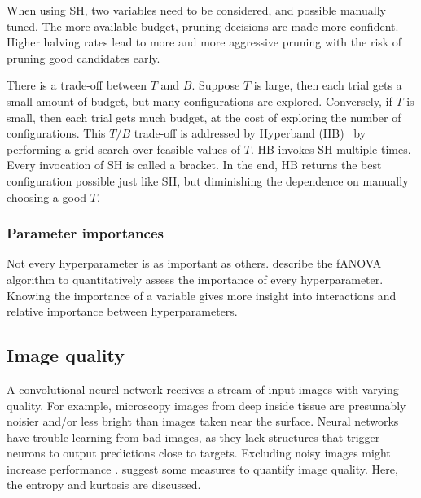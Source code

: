 When using SH, two variables need to be considered, and possible manually tuned.
The more available budget, pruning decisions are made more confident.
Higher halving rates lead to more and more aggressive pruning with the risk of pruning good candidates early.

There is a trade-off between $T$ and $B$.
Suppose $T$ is large, then each trial gets a small amount of budget, but many configurations are explored.
Conversely, if $T$ is small, then each trial gets much budget, at the cost of exploring the number of configurations.
This $T/B$ trade-off is addressed by Hyperband (HB)~ by performing a grid search over feasible values of $T$.
HB invokes SH multiple times.
Every invocation of SH is called a bracket.
In the end, HB returns the best configuration possible just like SH, but diminishing the dependence on manually choosing a good $T$.

\subsubsection{Parameter importances}
Not every hyperparameter is as important as others.
\textcite{Hutter2014} describe the fANOVA algorithm to quantitatively assess the importance of every hyperparameter.
Knowing the importance of a variable gives more insight into interactions and relative importance between hyperparameters.



\subsection{Image quality}\label{subsec:imq}
A convolutional neurel network receives a stream of input images with varying quality.
For example, microscopy images from deep inside tissue are presumably noisier and/or less bright than images taken near the surface.
Neural networks have trouble learning from bad images, as they lack structures that trigger neurons to output predictions close to targets.
Excluding noisy images might increase performance .
\textcite{Koho2016} suggest some measures to quantify image quality.
Here, the entropy and kurtosis are discussed.


